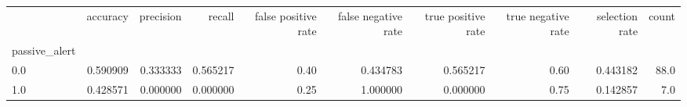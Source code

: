 \begin{tabular}{lrrrrrrrrr}
\toprule
{} &  accuracy &  precision &    recall &  false positive rate &  false negative rate &  true positive rate &  true negative rate &  selection rate &  count \\
passive\_alert &           &            &           &                      &                      &                     &                     &                 &        \\
\midrule
0.0           &  0.590909 &   0.333333 &  0.565217 &                 0.40 &             0.434783 &            0.565217 &                0.60 &        0.443182 &   88.0 \\
1.0           &  0.428571 &   0.000000 &  0.000000 &                 0.25 &             1.000000 &            0.000000 &                0.75 &        0.142857 &    7.0 \\
\bottomrule
\end{tabular}
